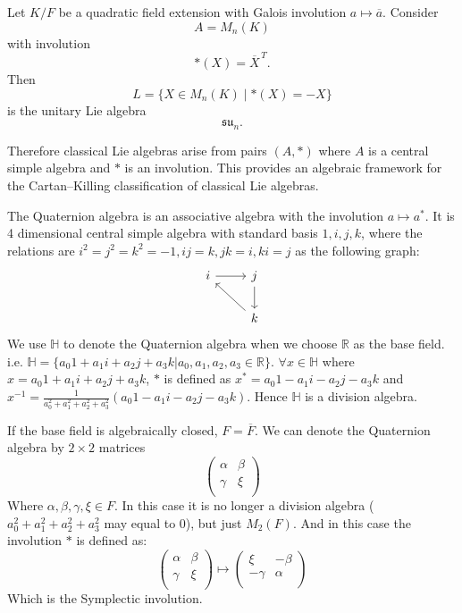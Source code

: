 \begin{example}
    Let $K/F$ be a quadratic field extension with Galois involution
    $a\mapsto \overline{a}$.  Consider
    \[
        A=M_n(K)
    \]
    with involution
    \[
        *(X)=\overline{X}^{\,T}.
    \]
    Then
    \[
        L=\{X\in M_n(K)\mid *(X)=-X\}
    \]
    is the unitary Lie algebra
    \[
        \mathfrak{su}_n .
    \]
\end{example}

Therefore classical Lie algebras arise from pairs $(A,*)$ where
$A$ is a central simple algebra and $*$ is an involution.  This
provides an algebraic framework for the Cartan--Killing classification
of classical Lie algebras.

\begin{example}
    The Quaternion algebra is an associative algebra with the involution $ a \mapsto a^* $. It is 4 dimensional central simple algebra with standard basis $ 1,i,j,k $, where the relations are $ i^2 = j^2 = k^2  = -1, ij=k, jk=i, ki=j $ as the following graph:
    \[
        \begin{tikzcd}
            i \arrow[r] & j \arrow[d]  \\
            & k \arrow[lu]
        \end{tikzcd}
    \]
    We use $ \mathbb{H} $ to denote the Quaternion algebra when we choose $ \mathbb{R} $ as the base field. i.e. $ \mathbb{H}=\{ a_0 1 + a_1 i + a_2 j + a_3 k | a_0,a_1,a_2,a_3 \in \mathbb{R} \} $. $ \forall x \in \mathbb{H} $ where $ x=a_0 1 + a_1 i + a_2 j + a_3 k $, $ * $ is defined as $ x^* = a_0 1 - a_1 i - a_2 j - a_3 k $ and $ x^{-1}= \frac{1}{a_0^2 + a_1^2 + a_2^2 + a_3^2} (a_0 1 - a_1 i - a_2 j - a_3 k) $. Hence $ \mathbb{H} $ is a division algebra.

    If the base field is algebraically closed, $F =\overline{F}$. We can denote the Quaternion algebra by $ 2 \times 2 $ matrices
    \[
        \begin{pmatrix}
            \alpha & \beta \\
            \gamma & \xi   \\
        \end{pmatrix}
    \]
    Where $ \alpha, \beta, \gamma, \xi \in F $. In this case it is no longer a division algebra ($a_0^2 + a_1^2 + a_2^2 + a_3^2$ may equal to 0), but just $ M_2(F) $. And in this case the involution $ * $ is defined as:
    \[
        \begin{pmatrix}
            \alpha & \beta \\
            \gamma & \xi   \\
        \end{pmatrix}
        \mapsto
        \begin{pmatrix}
            \xi     & -\beta \\
            -\gamma & \alpha \\
        \end{pmatrix}
    \]
    Which is the Symplectic involution.
\end{example}

